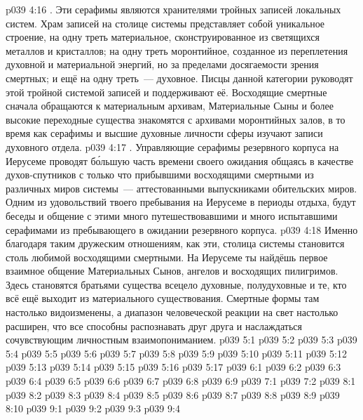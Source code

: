 \vs p039 4:16 . Эти серафимы являются хранителями тройных записей локальных систем. Храм записей на столице системы представляет собой уникальное строение, на одну треть материальное, сконструированное из светящихся металлов и кристаллов; на одну треть моронтийное, созданное из переплетения духовной и материальной энергий, но за пределами досягаемости зрения смертных; и ещё на одну треть~--- духовное. Писцы данной категории руководят этой тройной системой записей и поддерживают её. Восходящие смертные сначала обращаются к материальным архивам, Материальные Сыны и более высокие переходные существа знакомятся с архивами моронтийных залов, в то время как серафимы и высшие духовные личности сферы изучают записи духовного отдела.
\vs p039 4:17 . Управляющие серафимы резервного корпуса на Иерусеме проводят б\'ольшую часть времени своего ожидания общаясь в качестве духов\hyp{}спутников с только что прибывшими восходящими смертными из различных миров системы~--- аттестованными выпускниками обительских миров. Одним из удовольствий твоего пребывания на Иерусеме в периоды отдыха, будут беседы и общение с этими много путешествовавшими и много испытавшими серафимами из пребывающего в ожидании резервного корпуса.
\vs p039 4:18 Именно благодаря таким дружеским отношениям, как эти, столица системы становится столь любимой восходящими смертными. На Иерусеме ты найдёшь первое взаимное общение Материальных Сынов, ангелов и восходящих пилигримов. Здесь становятся братьями существа всецело духовные, полудуховные и те, кто всё ещё выходит из материального существования. Смертные формы там настолько видоизменены, а диапазон человеческой реакции на свет настолько расширен, что все способны распознавать друг друга и наслаждаться сочувствующим личностным взаимопониманием.
\vs p039 5:1 
\vs p039 5:2 
\vs p039 5:3 
\vs p039 5:4 
\vs p039 5:5 
\vs p039 5:6 
\vs p039 5:7 
\vs p039 5:8 
\vs p039 5:9 
\vs p039 5:10 
\vs p039 5:11 \pc 
\vs p039 5:12 
\vs p039 5:13 \pc 
\vs p039 5:14 
\vs p039 5:15 \pc 
\vs p039 5:16 
\vs p039 5:17 
\vs p039 6:1 
\vs p039 6:2 
\vs p039 6:3 
\vs p039 6:4 
\vs p039 6:5 
\vs p039 6:6 
\vs p039 6:7 
\vs p039 6:8 
\vs p039 6:9 \pc 
{}
\vs p039 7:1 
\vs p039 7:2 
\vs p039 8:1 
\vs p039 8:2 \pc 
\vs p039 8:3 
\vs p039 8:4 
\vs p039 8:5 
\vs p039 8:6 
\vs p039 8:7 \pc 
\vs p039 8:8 
\vs p039 8:9 \pc 
\vs p039 8:10 
\vs p039 9:1 
\vs p039 9:2 
\vs p039 9:3 
\vsetoff
\vs p039 9:4 
\quizlink
